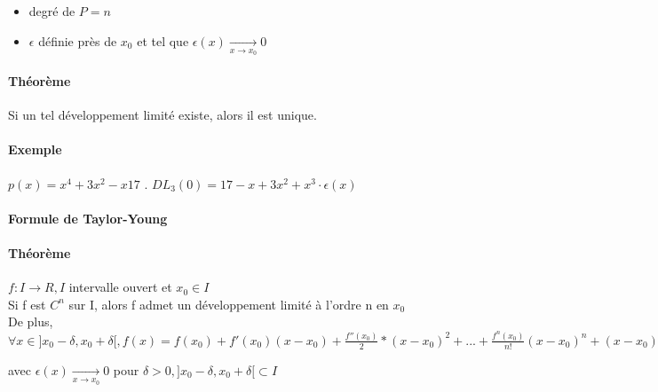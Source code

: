 \begin{itemize}
	\item degré de $P = n$
	\item $\epsilon$ définie près de $x_0$ et tel que $\epsilon(x) \xrightarrow[x \to x_0]{} 0$
\end{itemize}

\paragraph{Théorème} Si un tel développement limité existe, alors il est unique.
\paragraph{Exemple} $p(x) = x^4 + 3x^2 -x 17$ . $DL_3(0) = 17 -x +3x^2 + x^3\cdot \epsilon(x)$

\paragraph{Formule de Taylor-Young}
\paragraph{Théorème} $f : I \rightarrow R, I$ intervalle ouvert et $x_0 \in I$ ~\\
Si f est $C^n$ sur I, alors f admet un développement limité à l'ordre n en $x_0$ ~\\
De plus, $\forall x \in ]x_0-\delta, x_0+\delta[, f(x)=f(x_0)+f'(x_0)(x-x_0)+\frac{f''(x_0)}{2}*(x-x_0)^2 + ... + \frac{f^n(x_0)}{n!}(x-x_0)^n + (x-x_0)^n \epsilon(x)$

avec $\epsilon (x) \xrightarrow[x \to x_0]{} 0$ pour $\delta > 0, ]x_0-\delta, x_0+\delta[ \subset I$

